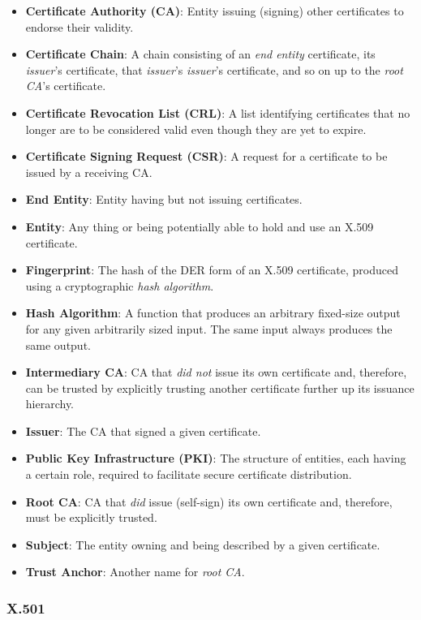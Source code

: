 \begin{itemize}
\item \textbf{Certificate Authority (CA)}: Entity issuing (signing) other certificates to endorse their validity.
\item \textbf{Certificate Chain}: A chain consisting of an \textit{end entity} certificate, its \textit{issuer}'s certificate, that \textit{issuer}'s \textit{issuer}'s certificate, and so on up to the \textit{root CA}'s certificate.
\item \textbf{Certificate Revocation List (CRL)}: A list identifying certificates that no longer are to be considered valid even though they are yet to expire.
\item \textbf{Certificate Signing Request (CSR)}: A request for a certificate to be issued by a receiving CA.
\item \textbf{End Entity}: Entity having but not issuing certificates.
\item \textbf{Entity}: Any thing or being potentially able to hold and use an X.509 certificate.
\item \textbf{Fingerprint}: The hash of the DER form of an X.509 certificate, produced using a cryptographic \textit{hash algorithm}.
\item \textbf{Hash Algorithm}: A function that produces an arbitrary fixed-size output for any given arbitrarily sized input. The same input always produces the same output.
\item \textbf{Intermediary CA}: CA that \textit{did not} issue its own certificate and, therefore, can be trusted by explicitly trusting another certificate further up its issuance hierarchy.
\item \textbf{Issuer}: The CA that signed a given certificate.
\item \textbf{Public Key Infrastructure (PKI)}: The structure of entities, each having a certain role, required to facilitate secure certificate distribution.
\item \textbf{Root CA}: CA that \textit{did} issue (self-sign) its own certificate and, therefore, must be explicitly trusted.
\item \textbf{Subject}: The entity owning and being described by a given certificate.
\item \textbf{Trust Anchor}: Another name for \textit{root CA}.
\end{itemize}

\subsubsection{X.501}


